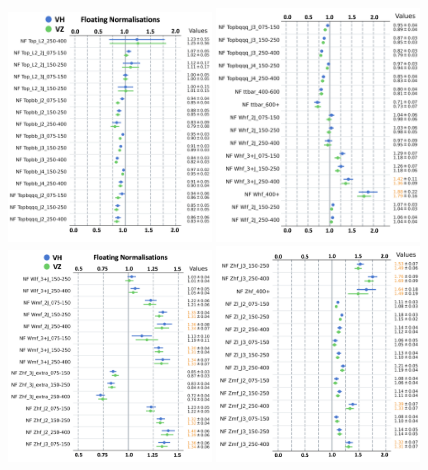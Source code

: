 \begin{figure}[h!]
    \centering
    \includegraphics[width=0.48\textwidth]{Images/VH/Fit/fromSlides/FN/FN1.png}
    \includegraphics[width=0.48\textwidth]{Images/VH/Fit/fromSlides/FN/FN2.png}\\
    \includegraphics[width=0.48\textwidth]{Images/VH/Fit/fromSlides/FN/FN3.png}
    \includegraphics[width=0.48\textwidth]{Images/VH/Fit/fromSlides/FN/FN4.png}

\end{figure}
